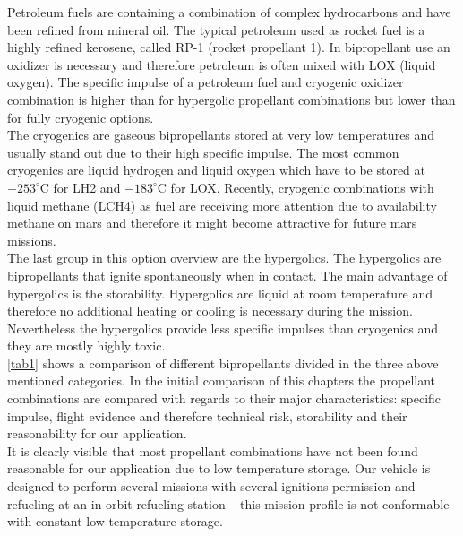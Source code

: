 Petroleum fuels are containing a combination of complex hydrocarbons and have been refined from mineral oil. The typical petroleum used as rocket fuel is a highly refined kerosene, called RP-1 (rocket propellant 1). In bipropellant use an oxidizer is necessary and therefore petroleum is often mixed with LOX (liquid oxygen). The specific impulse of a petroleum fuel and cryogenic oxidizer combination is higher than for hypergolic propellant combinations but lower than for fully cryogenic options. \\

The cryogenics are gaseous bipropellants stored at very low temperatures and usually stand out due to their high specific impulse. The most common cryogenics are liquid hydrogen and liquid oxygen which have to be stored at $-253^\circ$C for LH2 and $-183^\circ$C for LOX. Recently, cryogenic combinations with liquid methane (LCH4) as fuel are receiving more attention due to availability methane on mars and therefore it might become attractive for future mars missions.\\

The last group in this option overview are the hypergolics. The hypergolics are bipropellants that ignite spontaneously when in contact. The main advantage of hypergolics is the storability. Hypergolics are liquid at room temperature and therefore no additional heating or cooling is necessary during the mission. Nevertheless the hypergolics provide less specific impulses than cryogenics and they are mostly highly toxic.\\

\autoref{tab1} shows a comparison of different bipropellants divided in the three above mentioned categories. In the initial comparison of this chapters the propellant combinations are compared with regards to their major characteristics: specific impulse, flight evidence and therefore technical risk, storability and their reasonability for our application. \\

It is clearly visible that most propellant combinations have not been found reasonable for our application due to low temperature storage. Our vehicle is designed to perform several missions with several ignitions permission and refueling at an in orbit refueling station – this mission profile is not conformable with constant low temperature storage. \\

